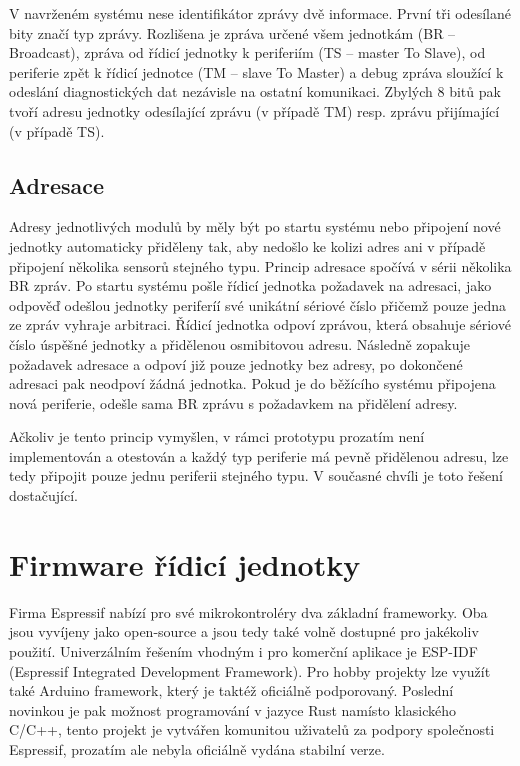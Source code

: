     V navrženém systému nese identifikátor zprávy dvě informace. První tři odesílané bity značí typ zprávy. Rozlišena je zpráva určené všem jednotkám (BR -- Broadcast), zpráva od řídicí jednotky k periferiím (TS -- master To Slave), od periferie zpět k řídicí jednotce (TM -- slave To Master) a debug zpráva sloužící k odeslání diagnostických dat nezávisle na ostatní komunikaci. Zbylých 8 bitů pak tvoří adresu jednotky odesílající zprávu (v případě TM) resp. zprávu přijímající (v případě TS). 
    
    \subsection{Adresace}
    Adresy jednotlivých modulů by měly být po startu systému nebo připojení nové jednotky automaticky přiděleny tak, aby nedošlo ke kolizi adres ani v případě připojení několika sensorů stejného typu. Princip adresace spočívá v sérii několika BR zpráv. Po startu systému pošle řídicí jednotka požadavek na adresaci, jako odpověď odešlou jednotky periferíí své unikátní sériové číslo přičemž pouze jedna ze zpráv vyhraje arbitraci. Řídicí jednotka odpoví zprávou, která obsahuje sériové číslo úspěšné jednotky a přidělenou osmibitovou adresu. Následně zopakuje požadavek adresace a odpoví již pouze jednotky bez adresy, po dokončené adresaci pak neodpoví žádná jednotka. Pokud je do běžícího systému připojena nová periferie, odešle sama BR zprávu s požadavkem na přidělení adresy.

    Ačkoliv je tento princip vymyšlen, v rámci prototypu prozatím není implementován a otestován a každý typ periferie má pevně přidělenou adresu, lze tedy připojit pouze jednu periferii stejného typu. V současné chvíli je toto řešení dostačující.



\section{Firmware řídicí jednotky}
    Firma Espressif nabízí pro své mikrokontroléry dva základní frameworky. Oba jsou vyvíjeny jako open-source a jsou tedy také volně dostupné pro jakékoliv použití. Univerzálním řešením vhodným i pro komerční aplikace je ESP-IDF (Espressif Integrated Development Framework). Pro hobby projekty lze využít také Arduino framework, který je taktéž oficiálně podporovaný. Poslední novinkou je pak možnost programování v jazyce Rust namísto klasického C/C++, tento projekt je vytvářen komunitou uživatelů za podpory společnosti Espressif, prozatím ale nebyla oficiálně vydána stabilní verze. 

